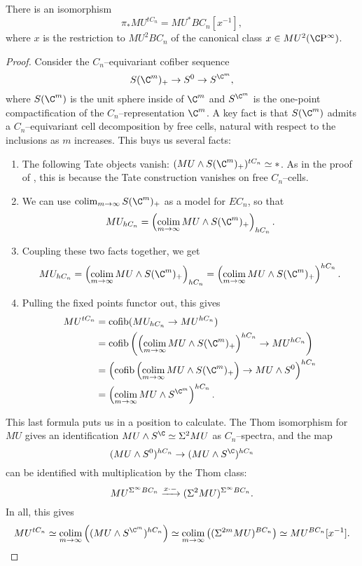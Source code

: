 \begin{theorem}
There is an isomorphism \[\pi_* MU^{tC_n} = MU^* BC_n[x^{-1}],\] where $x$ is the restriction to $MU^2 BC_n$ of the canonical class $x \in MU^2(\CP^\infty)$.
\end{theorem}
\begin{proof}
Consider the $C_n$--equivariant cofiber sequence \[S(\C^m)_+ \to S^0 \to S^{\C^m},\] where $S(\C^m)$ is the unit sphere inside of $\C^m$ and $S^{\C^m}$ is the one-point compactification of the $C_n$--representation $\C^m$.  A key fact is that $S(\C^m)$ admits a $C_n$--equivariant cell decomposition by free cells, natural with respect to the inclusions as $m$ increases.  This buys us several facts:
\begin{enumerate}
    \item The following Tate objects vanish: $(MU \sm S(\C^m)_+)^{tC_n} \simeq *$.  As in the proof of , this is because the Tate construction vanishes on free $C_n$--cells.
    \item We can use $\colim_{m \to \infty} S(\C^m)_+$ as a model for $EC_n$, so that \[MU_{hC_n} = \left( \colim_{m \to \infty} MU \sm S(\C^m)_+ \right)_{hC_n}.\]
    \item Coupling these two facts together, we get \[MU_{hC_n} = \left( \colim_{m \to \infty} MU \sm S(\C^m)_+ \right)_{hC_n} = \left( \colim_{m \to \infty} MU \sm S(\C^m)_+ \right)^{hC_n}.\]
    \item Pulling the fixed points functor out, this gives
    \begin{align*}
    MU^{tC_n} & = \cofib(MU_{hC_n} \to MU^{hC_n}) \\
    & = \cofib\left(\left( \colim_{m \to \infty} MU \sm S(\C^m)_+ \right)^{hC_n} \to MU^{hC_n}\right) \\
    & = \left(\cofib\left( \colim_{m \to \infty} MU \sm S(\C^m)_+ \right) \to MU \sm S^0\right)^{hC_n} \\
    & = \left( \colim_{m \to \infty} MU \sm S^{\C^m} \right)^{hC_n}.
    \end{align*}
\end{enumerate}
This last formula puts us in a position to calculate.  The Thom isomorphism for $MU$ gives an identification $MU \sm S^{\C} \simeq \Susp^2 MU$ as $C_n$--spectra, and the map \[(MU \sm S^0)^{hC_n} \to (MU \sm S^{\C})^{hC_n}\] can be identified with multiplication by the Thom class: \[MU^{\Sigma^\infty BC_n} \xrightarrow{x \cdot -} (\Sigma^2 MU)^{\Sigma^\infty BC_n}.\]  In all, this gives \[MU^{tC_n} \simeq \colim_{m \to \infty} \left((MU \sm S^{\C^m})^{hC_n}\right) \simeq \colim_{m \to \infty} \left((\Susp^{2m} MU)^{BC_n}\right) \simeq MU^{BC_n}[x^{-1}]. \qedhere\]
\end{proof}

